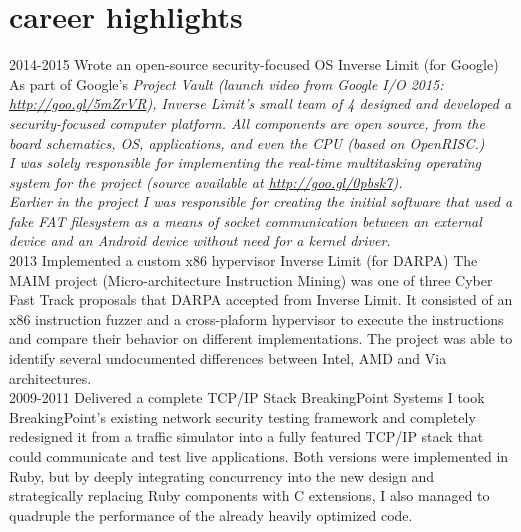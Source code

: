\documentclass[]{friggeri-cv}
\begin{document}
\section{career highlights}

\begin{entrylist}
  \entry
      {2014-2015}
      {Wrote an open-source security-focused OS}
      {Inverse Limit (for Google)}
      {
        As part of Google's \em{Project Vault} (launch video from Google I/O 2015: \href{http://goo.gl/5mZrVR}{http://goo.gl/5mZrVR}), Inverse Limit's small team of 4 designed and developed a security-focused computer platform. All components are open source, from the board schematics, OS, applications, and even the CPU (based on OpenRISC.)\\
        
        I was solely responsible for implementing the real-time multitasking operating system for the project (source available at \href{http://goo.gl/0pbsk7}{http://goo.gl/0pbsk7}).\\
        
        Earlier in the project I was responsible for creating the initial software that used a fake FAT filesystem as a means of socket communication between an external device and an Android device without need for a kernel driver.\\

      }
  \entry
      {2013}
      {Implemented a custom x86 hypervisor}
      {Inverse Limit (for DARPA)}
      {The MAIM project (Micro-architecture Instruction Mining) was one of three Cyber Fast Track proposals that DARPA accepted from Inverse Limit. It consisted of an x86 instruction fuzzer and a cross-plaform hypervisor to execute the instructions and compare their behavior on different implementations. The project was able to identify several undocumented differences between Intel, AMD and Via architectures.\\

      }
  \entry
      {2009-2011}
      {Delivered a complete TCP/IP Stack}
      {BreakingPoint Systems}
      {I took BreakingPoint's existing network security testing framework and completely redesigned it from a traffic simulator into a fully featured TCP/IP stack that could communicate and test live applications. Both versions were implemented in Ruby, but by deeply integrating concurrency into the new design and strategically replacing Ruby components with C extensions, I also managed to quadruple the performance of the already heavily optimized code.}
\end{entrylist}
\newpage
\end{document}
